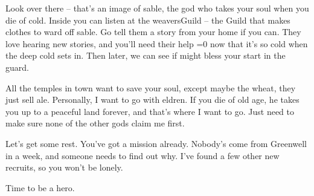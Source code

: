 \begin{multicols}{2}
\begin{exampletext}
  Look over there -- that's an image of \gls{sable}, the god who takes your soul when you die of cold.
  Inside you can listen at the \gls{weaversGuild} -- the Guild that makes clothes to ward off \gls{sable}.
  Go tell them a story from your home if you can.
  They love hearing new stories, and you'll need their help \ifnum\value{temperature}=0 now that it's so cold \else when the deep cold sets in\fi.
  Then later, we can see if  might bless your start in the \gls{guard}.

  All the temples in town want to save your soul, except maybe the \gls{wheat}, they just sell ale.
  Personally, I want to go with \gls{eldren}.
  If you die of old age, he takes you up to a peaceful land forever, and that's where I want to go.
  Just need to make sure none of the other gods claim me first.

  Let's get some rest.
  You've got a mission already.
  Nobody's come from Greenwell in a week, and someone needs to find out why.
  I've found a few other new recruits, so you won't be lonely.

  Time to be a hero.

\end{exampletext}

\end{multicols}
